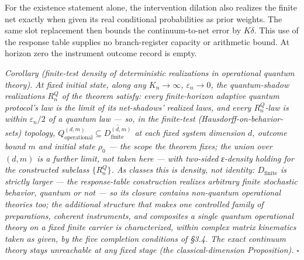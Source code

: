 \documentclass[
]{article}
\begin{document}
For the existence statement alone, the intervention dilation also
realizes the finite net exactly when given its real conditional
probabilities as prior weights. The same slot replacement then bounds
the continuum-to-net error by \(K\delta\). This use of the response
table supplies no branch-register capacity or arithmetic bound. At
horizon zero the instrument outcome record is empty.

\emph{Corollary (finite-test density of deterministic realizations in
operational quantum theory).} \emph{At fixed initial state, along any
\(K_n \to \infty\), \(\varepsilon_n \to 0\), the quantum-shadow
realizations \(R^Q_n\) of the theorem satisfy: every finite-horizon
adaptive quantum protocol's law is the limit of its net-shadows'
realized laws, and every \(R^Q_n\)-law is within \(\varepsilon_n/2\) of
a quantum law --- so, in the finite-test (Hausdorff-on-behavior-sets)
topology,
\(Q^{(d,m)}_{\mathrm{operational}} \subseteq \overline{D^{(d,m)}_{\mathrm{finite}}}\)
at each fixed system dimension \(d\), outcome bound \(m\) and initial
state \(\rho_0\) --- the scope the theorem fixes; the union over
\((d, m)\) is a further limit, not taken here --- with two-sided
ε-density holding for the constructed subclass \(\{R^Q_n\}\). As classes
this is density, not identity: \(D_{\mathrm{finite}}\) is strictly
larger --- the response-table construction realizes arbitrary finite
stochastic behavior, quantum or not --- so its closure contains
non-quantum operational theories too; the additional structure that
makes one controlled family of preparations, coherent instruments, and
composites a single quantum operational theory on a fixed finite carrier
is characterized, within complex matrix kinematics taken as given, by
the five completion conditions of §3.4. The exact continuum theory stays
unreachable at any fixed stage (the classical-dimension Proposition).}
\(\square\)
\end{document}
